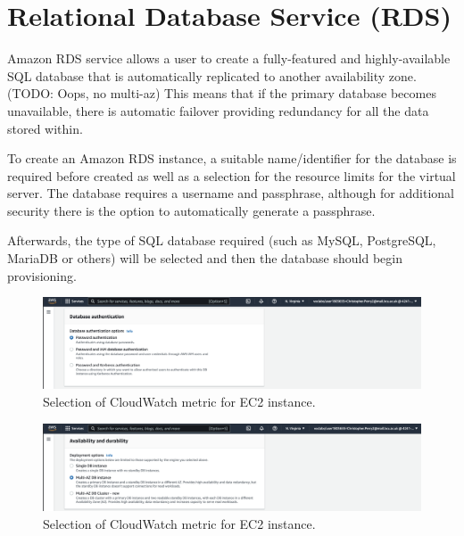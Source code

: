 \chapter{Relational Database Service (RDS)}\label{ch:relational-database-service}
Amazon RDS service allows a user to create a fully-featured and highly-available SQL database that is automatically
replicated to another availability zone. (TODO: Oops, no multi-az) This means that if the primary database becomes
unavailable, there is automatic failover providing redundancy for all the data stored within.

To create an Amazon RDS instance, a suitable name/identifier for the database is required before created as well as a
selection for the resource limits for the virtual server.
The database requires a username and passphrase, although for additional security there is the option to automatically
generate a passphrase.

Afterwards, the type of SQL database required (such as MySQL, PostgreSQL, MariaDB or others) will be selected and then
the database should begin provisioning.

\begin{figure}[!htbp]
    \centering
    \includegraphics[width=\textwidth]{resources/rds/rds-authentication.png}
    \caption{Selection of CloudWatch metric for EC2 instance.}
    \label{fig:rds-auth}
\end{figure}

\begin{figure}[!htbp]
    \centering
    \includegraphics[width=\textwidth]{resources/rds/rds-availability-durability.png}
    \caption{Selection of CloudWatch metric for EC2 instance.}
    \label{fig:rds-avail}
\end{figure}

